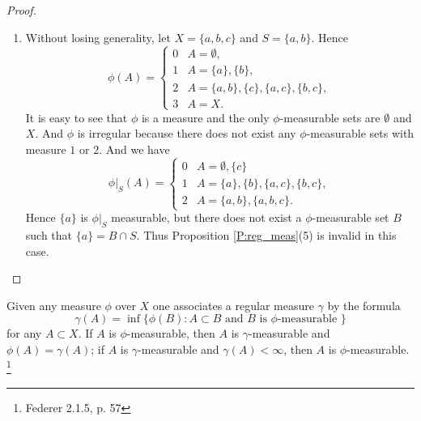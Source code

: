 \begin{proof}
\begin{enumerate}
    $\{e\}$ are $f_\#\phi$-measurable, but neither $\{a,b\}$ nor $\{c\}$ are
    $\phi$-measurable. Hence Proposition \ref{P:reg_meas}(4) is invalid in this
    case.
  \item Without losing generality, let $X=\{a,b,c\}$ and $S=\{a,b\}$. Hence
    \begin{equation*}
      \phi(A) =
      \begin{cases}
        0 & A=\emptyset,  \\
        1 & A=\{a\},\{b\},  \\
        2 & A=\{a,b\},\{c\},\{a,c\},\{b,c\},  \\
        3 & A=X.
      \end{cases}
    \end{equation*}
    It is easy to see that $\phi$ is a measure and the only $\phi$-measurable
    sets are $\emptyset$ and $X$. And $\phi$ is irregular because there does 
    not exist any $\phi$-measurable sets with measure $1$ or $2$. And we have
    \begin{equation*}
      \phi|_S(A) =
      \begin{cases}
        0 & A=\emptyset,\{c\}  \\
        1 & A=\{a\},\{b\},\{a,c\},\{b,c\},  \\
        2 & A=\{a,b\},\{a,b,c\}.
      \end{cases}
    \end{equation*}
    Hence $\{a\}$ is $\phi|_S$ measurable, but there does not exist a
    $\phi$-measurable set $B$ such that $\{a\}=B\cap S$.
    Thus Proposition \ref{P:reg_meas}(5) is invalid in this case.
\end{enumerate}
\end{proof}


\begin{lemma} \label{L:reg_meas}
Given any measure $\phi$ over $X$ one associates a regular measure $\gamma$ by
the formula
\[
  \gamma(A)=\inf \{\phi(B): \text{$A\subset B$ and $B$ is $\phi$-measurable } \}
\]
for any $A\subset X$. If $A$ is $\phi$-measurable, then $A$ is
$\gamma$-measurable and $\phi(A)=\gamma(A)$; if $A$ is $\gamma$-measurable and
$\gamma(A)<\infty$, then $A$ is $\phi$-measurable.
\footnote{Federer 2.1.5, p. 57}
\end{lemma}

